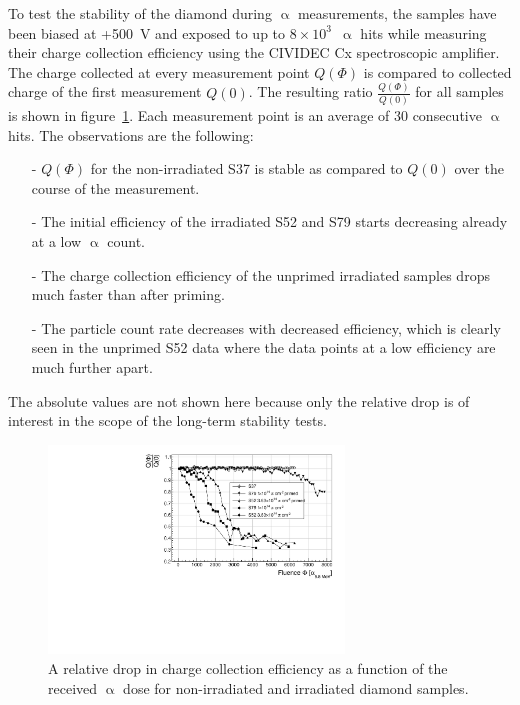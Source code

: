 To test the stability of the diamond during $\upalpha$ measurements, the samples have been biased at +500~V and exposed to up to $8\times10^3$~$\upalpha$ hits while measuring their charge collection efficiency using the CIVIDEC Cx spectroscopic amplifier. The charge collected at every measurement point $Q(\Phi)$ is compared to collected charge of the first measurement $Q(0)$. The resulting ratio $\frac{Q(\Phi)}{Q(0)}$ for all samples is shown in figure~\ref{fig:longtermcx}. Each measurement point is an average of 30 consecutive $\upalpha$ hits. The observations are the following:
\begin{itemize}
\item[-] $Q(\Phi)$ for the non-irradiated S37 is stable as compared to $Q(0)$ over the course of the measurement.
\item[-] The initial efficiency of the irradiated S52 and S79 starts decreasing already at a low $\upalpha$ count.
\item[-] The charge collection efficiency of the unprimed irradiated samples drops much faster than after priming.
\item[-] The particle count rate decreases with decreased efficiency, which is clearly seen in the unprimed S52 data where the data points at a low efficiency are much further apart.
\end{itemize}
The absolute values are not shown here because only the relative drop is of interest in the scope of the long-term stability tests.

\begin{figure}[!t]
\begin{center}
\includegraphics[width=0.7\textwidth]{03_measurement_results/scripts/plots/amplvstimecx4}
\caption{A relative drop in charge collection efficiency as a function of the received $\upalpha$ dose for non-irradiated and irradiated diamond samples.}
\label{fig:longtermcx}
\end{center}
\end{figure}

